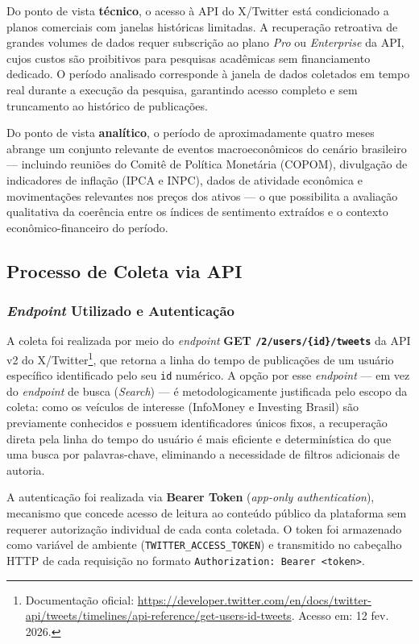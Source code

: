 Do ponto de vista \textbf{técnico}, o acesso à API do X/Twitter está condicionado a planos comerciais com janelas históricas limitadas. A recuperação retroativa de grandes volumes de dados requer subscrição ao plano \textit{Pro} ou \textit{Enterprise} da API, cujos custos são proibitivos para pesquisas acadêmicas sem financiamento dedicado. O período analisado corresponde à janela de dados coletados em tempo real durante a execução da pesquisa, garantindo acesso completo e sem truncamento ao histórico de publicações.

Do ponto de vista \textbf{analítico}, o período de aproximadamente quatro meses abrange um conjunto relevante de eventos macroeconômicos do cenário brasileiro — incluindo reuniões do Comitê de Política Monetária (COPOM), divulgação de indicadores de inflação (IPCA e INPC), dados de atividade econômica e movimentações relevantes nos preços dos ativos — o que possibilita a avaliação qualitativa da coerência entre os índices de sentimento extraídos e o contexto econômico-financeiro do período.

\subsection{Processo de Coleta via API}
\label{subsec:coleta_api}

\subsubsection{\textit{Endpoint} Utilizado e Autenticação}
\label{subsubsec:endpoint}

A coleta foi realizada por meio do \textit{endpoint} \textbf{GET \texttt{/2/users/\{id\}/tweets}} da API v2 do X/Twitter\footnote{Documentação oficial: \url{https://developer.twitter.com/en/docs/twitter-api/tweets/timelines/api-reference/get-users-id-tweets}. Acesso em: 12 fev. 2026.}, que retorna a linha do tempo de publicações de um usuário específico identificado pelo seu \texttt{id} numérico. A opção por esse \textit{endpoint} — em vez do \textit{endpoint} de busca (\textit{Search}) — é metodologicamente justificada pelo escopo da coleta: como os veículos de interesse (InfoMoney e Investing Brasil) são previamente conhecidos e possuem identificadores únicos fixos, a recuperação direta pela linha do tempo do usuário é mais eficiente e determinística do que uma busca por palavras-chave, eliminando a necessidade de filtros adicionais de autoria.

A autenticação foi realizada via \textbf{Bearer Token} (\textit{app-only authentication}), mecanismo que concede acesso de leitura ao conteúdo público da plataforma sem requerer autorização individual de cada conta coletada. O token foi armazenado como variável de ambiente (\texttt{TWITTER\_ACCESS\_TOKEN}) e transmitido no cabeçalho HTTP de cada requisição no formato \texttt{Authorization: Bearer <token>}.

